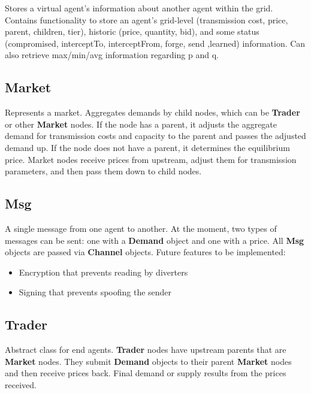 \documentclass[12pt]{article}
\begin{document}
Stores a virtual agent's information about another agent within the grid. 
Contains functionality to store an agent's 
grid-level (transmission cost, price, parent, children, tier), 
historic (price, quantity, bid), and some status (compromised, interceptTo, 
interceptFrom, forge, send ,learned) information. Can also 
retrieve max/min/avg information regarding p and q.

\subsection{Market} \mbox{}
\label{subsec:objects_market}

Represents a market.  Aggregates demands by child nodes, which can be 
\textbf{Trader} or other \textbf{Market} nodes. If the node has a parent, it adjusts 
the aggregate demand for transmission costs and capacity to the parent
and passes the adjusted demand up.  If the node does not have a parent, 
it determines the equilibrium price.  Market nodes receive prices from 
upstream, adjust them for transmission parameters, and then pass them 
down to child nodes.

\subsection{Msg} \mbox{}
\label{subsec:objects_msg}

A single message from one agent to another.  At the moment, two types of 
messages can be sent: one with a \textbf{Demand} object and one with a 
price.  All \textbf{Msg} objects are passed via \textbf{Channel} objects. Future 
features to be implemented:

\begin{itemize}
  \item{Encryption that prevents reading by diverters}
  \item{Signing that prevents spoofing the sender}
\end{itemize}

\subsection{Trader} \mbox{}
\label{subsec:objects_trader}

Abstract class for end agents. \textbf{Trader} nodes have upstream parents
that are \textbf{Market} nodes.  They submit \textbf{Demand} objects 
to their parent \textbf{Market} nodes and then receive prices back. 
Final demand or supply results from the prices received. 
\end{document}
